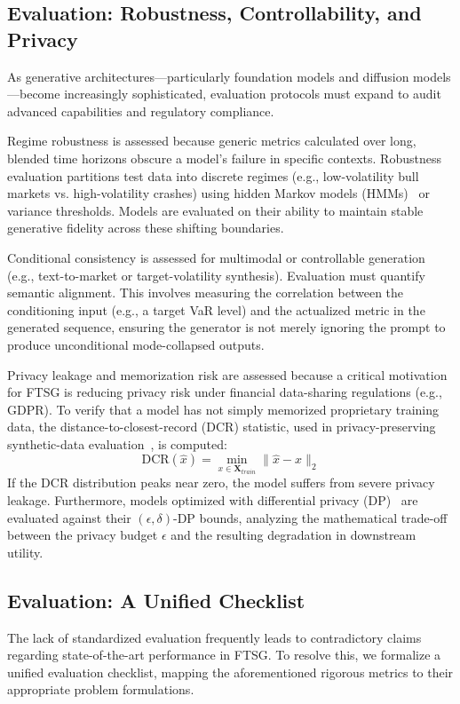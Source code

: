 \subsection{Evaluation: Robustness, Controllability, and Privacy}
As generative architectures—particularly foundation models and diffusion models—become increasingly sophisticated, evaluation protocols must expand to audit advanced capabilities and regulatory compliance.

Regime robustness is assessed because generic metrics calculated over long, blended time horizons obscure a model's failure in specific contexts. Robustness evaluation partitions test data into discrete regimes (e.g., low-volatility bull markets vs. high-volatility crashes) using hidden Markov models (HMMs)~\citep{rabiner1989tutorial,hamilton1989new} or variance thresholds. Models are evaluated on their ability to maintain stable generative fidelity across these shifting boundaries.

Conditional consistency is assessed for multimodal or controllable generation (e.g., text-to-market or target-volatility synthesis). Evaluation must quantify semantic alignment. This involves measuring the correlation between the conditioning input (e.g., a target VaR level) and the actualized metric in the generated sequence, ensuring the generator is not merely ignoring the prompt to produce unconditional mode-collapsed outputs.

Privacy leakage and memorization risk are assessed because a critical motivation for FTSG is reducing privacy risk under financial data-sharing regulations (e.g., GDPR). To verify that a model has not simply memorized proprietary training data, the distance-to-closest-record (DCR) statistic, used in privacy-preserving synthetic-data evaluation~\citep{bindschaedler2017plausible}, is computed:
    \begin{equation}
        \text{DCR}(\hat{x}) = \min_{x \in \mathbf{X}_{train}} \|\hat{x} - x\|_2
    \end{equation}
If the DCR distribution peaks near zero, the model suffers from severe privacy leakage. Furthermore, models optimized with differential privacy (DP)~\citep{dwork2006differential,dwork2014algorithmic} are evaluated against their $(\epsilon, \delta)$-DP bounds, analyzing the mathematical trade-off between the privacy budget $\epsilon$ and the resulting degradation in downstream utility.

\subsection{Evaluation: A Unified Checklist}
The lack of standardized evaluation frequently leads to contradictory claims regarding state-of-the-art performance in FTSG. To resolve this, we formalize a unified evaluation checklist, mapping the aforementioned rigorous metrics to their appropriate problem formulations.

